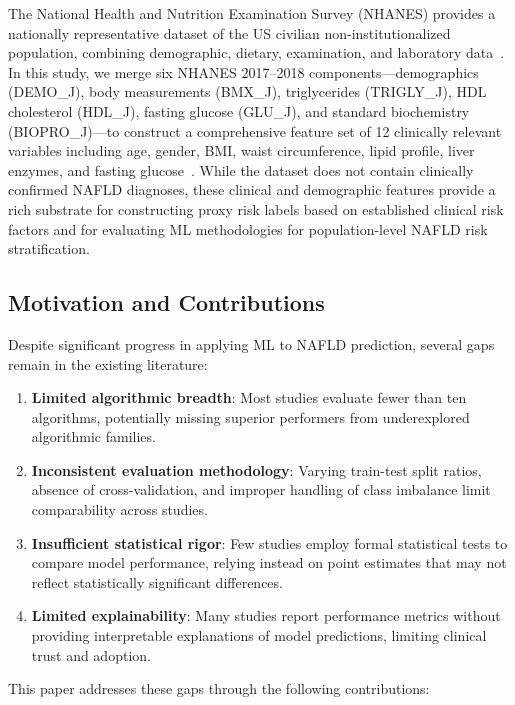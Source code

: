 \documentclass[conference,10pt]{IEEEtran}
\begin{document}
The National Health and Nutrition Examination Survey (NHANES) provides a nationally representative dataset of the US civilian non-institutionalized population, combining demographic, dietary, examination, and laboratory data~\cite{curtin2012nhanes}. In this study, we merge six NHANES 2017--2018 components---demographics (DEMO\_J), body measurements (BMX\_J), triglycerides (TRIGLY\_J), HDL cholesterol (HDL\_J), fasting glucose (GLU\_J), and standard biochemistry (BIOPRO\_J)---to construct a comprehensive feature set of 12 clinically relevant variables including age, gender, BMI, waist circumference, lipid profile, liver enzymes, and fasting glucose~\cite{younossi2016global}. While the dataset does not contain clinically confirmed NAFLD diagnoses, these clinical and demographic features provide a rich substrate for constructing proxy risk labels based on established clinical risk factors and for evaluating ML methodologies for population-level NAFLD risk stratification.

\subsection{Motivation and Contributions}

Despite significant progress in applying ML to NAFLD prediction, several gaps remain in the existing literature:

\begin{enumerate}[label=(\arabic*)]
    \item \textbf{Limited algorithmic breadth}: Most studies evaluate fewer than ten algorithms, potentially missing superior performers from underexplored algorithmic families.
    \item \textbf{Inconsistent evaluation methodology}: Varying train-test split ratios, absence of cross-validation, and improper handling of class imbalance limit comparability across studies.
    \item \textbf{Insufficient statistical rigor}: Few studies employ formal statistical tests to compare model performance, relying instead on point estimates that may not reflect statistically significant differences.
    \item \textbf{Limited explainability}: Many studies report performance metrics without providing interpretable explanations of model predictions, limiting clinical trust and adoption.
\end{enumerate}

This paper addresses these gaps through the following contributions:
\end{document}

